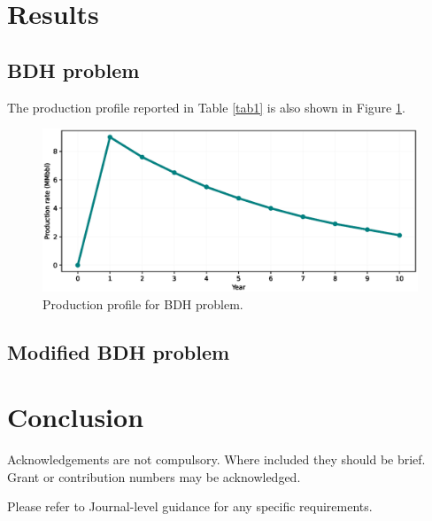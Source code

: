 \documentclass[pdflatex,sn-basic]{sn-jnl}%
\theoremstyle{thmstyleone}%
\theoremstyle{thmstyletwo}%
\theoremstyle{thmstylethree}%
\begin{document}
\section{Results}\label{sec5}

\subsection{BDH problem}\label{subsec51}

The production profile reported in Table \ref{tab1} is also shown in Figure \ref{fig15}.

\begin{figure}[H]
\centering
\begin{minipage}{0.95\textwidth}
  \includegraphics[width=\textwidth]{prod_profile.eps}
  \caption{Production profile for BDH problem.}
  \label{fig15}
\end{minipage}
\end{figure}

\subsection{Modified BDH problem}\label{subsec52}

\section{Conclusion}\label{sec6}




Acknowledgements are not compulsory. Where included they should be brief. Grant or contribution numbers may be acknowledged.

Please refer to Journal-level guidance for any specific requirements.






\end{document}

